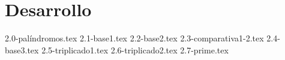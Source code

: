 \part{Desarrollo}

\setcounter{section}{-1}

{2.0-palíndromos.tex}
\newpage
{2.1-base1.tex}
\newpage
{2.2-base2.tex}
\newpage
{2.3-comparativa1-2.tex}
\newpage
{2.4-base3.tex}
\newpage
{2.5-triplicado1.tex}
\newpage
{2.6-triplicado2.tex}
\newpage
{2.7-prime.tex}
